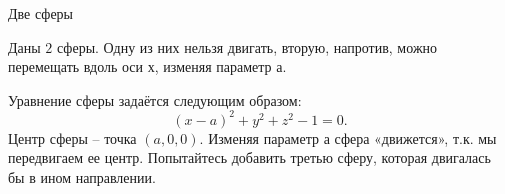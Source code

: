 \documentclass[ru]{./../../common/SurferDesc}%
\begin{document}
\footnotesize
%
\begin{surferPage}
  \begin{surferTitle}Две сферы\end{surferTitle}
   \begin{surferText}   

Даны $2$ сферы. Одну из них нельзя двигать, вторую, напротив, можно перемещать вдоль оси $х$, изменяя параметр $а$.

Уравнение сферы задаётся следующим образом:
\[(x-a)^2+y^2+z^2-1=0.\]
Центр сферы – точка $(a,0,0)$. Изменяя параметр а сфера «движется», т.к. мы передвигаем ее центр. Попытайтесь добавить третью сферу, которая двигалась бы в ином направлении.
     \end{surferText}
\end{surferPage}
\end{document}
